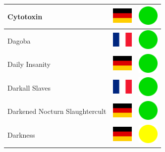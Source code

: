 \documentclass[12pt, a4paper, twoside]{report}
\begin{document}
\begin{center}
\begin{longtable}{|p{5cm}|p{2cm}|p{2cm}|}
			Cytotoxin & \includegraphics[width=1cm]{4x3/de} & \includegraphics[width=1cm]{likes/y} \\ \hline
			Dagoba & \includegraphics[width=1cm]{4x3/fr} & \includegraphics[width=1cm]{likes/y} \\ \hline
			Daily Insanity & \includegraphics[width=1cm]{4x3/de} & \includegraphics[width=1cm]{likes/y} \\ \hline
			Darkall Slaves & \includegraphics[width=1cm]{4x3/fr} & \includegraphics[width=1cm]{likes/y} \\ \hline
			Darkened Nocturn Slaughtercult & \includegraphics[width=1cm]{4x3/de} & \includegraphics[width=1cm]{likes/y} \\ \hline
			Darkness & \includegraphics[width=1cm]{4x3/de} & \includegraphics[width=1cm]{likes/m} \\ \hline

\end{longtable}
\end{center}
\end{document}
